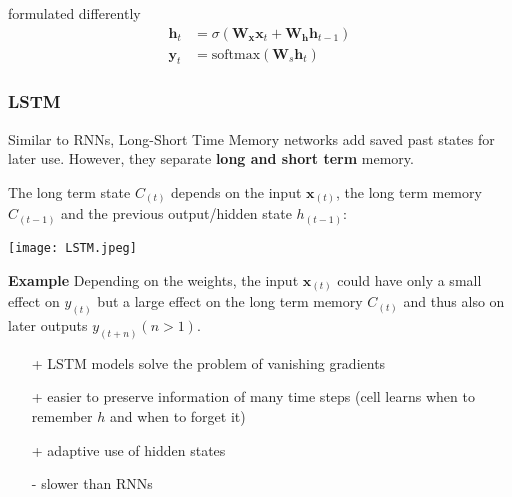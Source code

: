 formulated differently
\noindent\begin{align*}
    \mathbf{h}_t & = \sigma(\mathbf{W}_\mathbf{x} \mathbf{x}_t + \mathbf{W}_\mathbf{h} \mathbf{h}_{t-1}) \\
    \mathbf{y}_t & = \mathrm{softmax}(\mathbf{W}_s \mathbf{h}_t)
\end{align*}

\subsubsection{LSTM}
Similar to RNNs, Long-Short Time Memory networks add saved past states for later use. However, they separate \textbf{long and short term} memory.

The long term state $C_{(t)}$ depends on the input $\mathbf{x}_{(t)}$, the long term memory $C_{(t-1)}$ and the previous output/hidden state $h_{(t-1)}$:
\begin{center}
    \texttt{[image: LSTM.jpeg]}
\end{center}

\textbf{Example}
Depending on the weights, the input $\mathbf{x}_{(t)}$ could have only a small effect on $y_{(t)}$ but a large effect on the long term memory $C_{(t)}$ and thus also on later outputs $y_{(t+n)} (n>1)$.

\newpar{}
\begin{itemize}
    \item [+] LSTM models solve the problem of vanishing gradients
    \item [+] easier to preserve information of many time steps (cell learns when to remember $h$ and when to forget it)
    \item [+] adaptive use of hidden states
    \item [-] slower than RNNs
\end{itemize}
